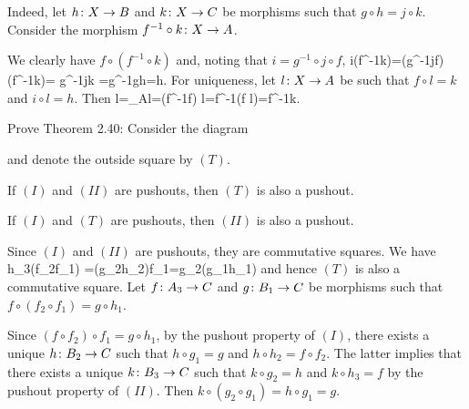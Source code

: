Indeed, let $h\colon X\to B$ and $k\colon X\to C$ be morphisms such that $g\circ h=j\circ k$. Consider the morphism $f^{-1}\circ k\colon X\to A$.
\bse
{}
\ese
We clearly have $f\circ (f^{-1}\circ k)$ and, noting that $i=g^{-1}\circ j\circ f$,
\bse
i\circ(f^{-1}\circ k)=(g^{-1}\circ j\circ f)\circ(f^{-1}\circ k)= g^{-1}\circ j\circ k =g^{-1}\circ g\circ h=h.
\ese
For uniqueness, let $l\colon X\to A$ be such that $f\circ l=k$ and $i\circ l=h$. Then
\bse
l=\id_A\circ l=(f^{-1}\circ f) \circ l=f^{-1}\circ (f \circ l)=f^{-1}\circ k.
\ese
\een
\es

\bp
Prove Theorem 2.40: Consider the diagram
\bse
{}
\ese
and denote the outside square by $(T)$.
\ben[label=(\alph*)]
\item If $(I)$ and $(II)$ are pushouts, then $(T)$ is also a pushout.
\item If $(I)$ and $(T)$ are pushouts, then $(II)$ is also a pushout.
\een
\ep

\bs
\ben[label=(\alph*)]
\item Since $(I)$ and $(II)$ are pushouts, they are commutative squares. We have
\bse
h_3\circ (f_2\circ f_1) =(g_2\circ h_2)\circ f_1=g_2\circ (g_1\circ h_1)
\ese
and hence $(T)$ is also a commutative square. Let $f\colon A_3\to C$ and $g\colon B_1\to C$ be morphisms such that $f\circ(f_2\circ f_1)=g\circ h_1$.
\bse
{}
\ese
Since $(f\circ f_2)\circ f_1=g\circ h_1$, by the pushout property of $(I)$, there exists a unique $h\colon B_2\to C$ such that $h\circ g_1=g$ and $h\circ h_2=f\circ f_2$. The latter implies that there exists a unique $k\colon B_3\to C$ such that $k\circ g_2 = h$ and $k\circ h_3=f$ by the pushout property of $(II)$. Then $k\circ(g_2\circ g_1)=h\circ g_1=g$.

